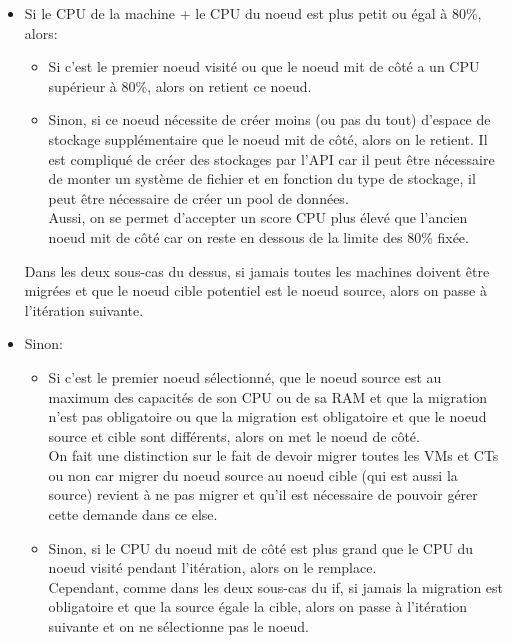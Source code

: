 \documentclass[14pt]{extarticle}
\begin{document}
    \begin{itemize}[nosep,label=\textendash]
        \item Si le CPU de la machine + le CPU du noeud est plus petit ou égal à 80\%, alors:
        \begin{itemize}[nosep,label=\textendash]
            \item Si c'est le premier noeud visité ou que le noeud mit de côté a un CPU supérieur à 80\%, alors on retient ce noeud.
            \item Sinon, si ce noeud nécessite de créer moins (ou pas du tout) d'espace de stockage supplémentaire que le noeud mit de côté, alors on le retient. Il est compliqué de créer des stockages par l'API car il peut être nécessaire de monter un système de fichier et en fonction du type de stockage, il peut être nécessaire de créer un pool de données.\\
            Aussi, on se permet d'accepter un score CPU plus élevé que l'ancien noeud mit de côté car on reste en dessous de la limite des 80\% fixée.
        \end{itemize}
        Dans les deux sous-cas du dessus, si jamais toutes les machines doivent être migrées et que le noeud cible potentiel est le noeud source, alors on passe à l'itération suivante.
        \item Sinon:
        \begin{itemize}[nosep,label=\textendash]
            \item Si c'est le premier noeud sélectionné, que le noeud source est au maximum des capacités de son CPU ou de sa RAM et que la migration n'est pas obligatoire ou que la migration est obligatoire et que le noeud source et cible sont différents, alors on met le noeud de côté.\\
            On fait une distinction sur le fait de devoir migrer toutes les VMs et CTs ou non car migrer du noeud source au noeud cible (qui est aussi la source) revient à ne pas migrer et qu'il est nécessaire de pouvoir gérer cette demande dans ce else.
            \item Sinon, si le CPU du noeud mit de côté est plus grand que le CPU du noeud visité pendant l'itération, alors on le remplace.\\
            Cependant, comme dans les deux sous-cas du if, si jamais la migration est obligatoire et que la source égale la cible, alors on passe à l'itération suivante et on ne sélectionne pas le noeud.\\
        \end{itemize}

\end{itemize}
\end{document}
